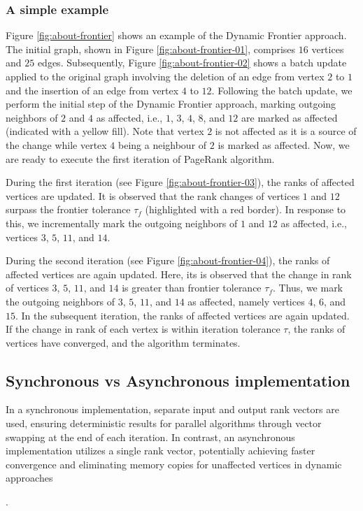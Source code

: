 \subsubsection{A simple example}

Figure \ref{fig:about-frontier} shows an example of the Dynamic Frontier approach. The initial graph, shown in Figure \ref{fig:about-frontier-01}, comprises $16$ vertices and $25$ edges. Subsequently, Figure \ref{fig:about-frontier-02} shows a batch update applied to the original graph involving the deletion of an edge from vertex $2$ to $1$ and the insertion of an edge from vertex $4$ to $12$. Following the batch update, we perform the initial step of the Dynamic Frontier approach, marking outgoing neighbors of $2$ and $4$ as affected, i.e., $1$, $3$, $4$, $8$, and $12$ are marked as affected (indicated with a yellow fill). Note that vertex $2$ is not affected as it is a source of the change while vertex $4$ being a neighbour of $2$ is marked as affected. Now, we are ready to execute the first iteration of PageRank algorithm.

During the first iteration (see Figure \ref{fig:about-frontier-03}), the ranks of affected vertices are updated. It is observed that the rank changes of vertices $1$ and $12$ surpass the frontier tolerance $\tau_f$ (highlighted with a red border). In response to this, we incrementally mark the outgoing neighbors of $1$ and $12$ as affected, i.e., vertices $3$, $5$, $11$, and $14$. 

During the second iteration (see Figure \ref{fig:about-frontier-04}), the ranks of affected vertices are again updated. Here, its is observed that the change in rank of vertices $3$, $5$, $11$, and $14$ is greater than frontier tolerance $\tau_f$. Thus, we mark the outgoing neighbors of $3$, $5$, $11$, and $14$ as affected, namely vertices $4$, $6$, and $15$. In the subsequent iteration, the ranks of affected vertices are again updated. If the change in rank of each vertex is within iteration tolerance $\tau$, the ranks of vertices have converged, and the algorithm terminates.




\subsection{Synchronous vs Asynchronous implementation}

In a synchronous implementation, separate input and output rank vectors are used, ensuring deterministic results for parallel algorithms through vector swapping at the end of each iteration. In contrast, an asynchronous implementation utilizes a single rank vector, potentially achieving faster convergence and eliminating memory copies for unaffected vertices in dynamic approaches.

